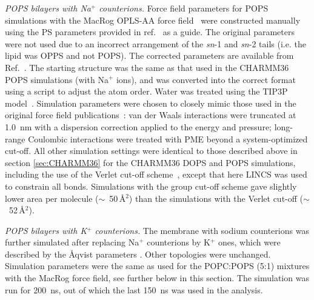 \documentclass[journal=jpcbfk,manuscript=article]{achemso}
\newcommand{\todo}[1]{\textcolor{red}{#1}}
\begin{document}
\noindent
{\it POPS bilayers with Na$^+$ counterions.}
Force field parameters for POPS simulations with the MacRog OPLS-AA force field~\cite{maciejewski14,kulig15b,rog16}
were constructed manually using the PS parameters provided in ref.~ as a guide. The original parameters were
not used due to an incorrect arrangement of the {\it sn}-1 and {\it sn}-2 tails (i.e. the lipid was OPPS and not POPS).
The corrected parameters are available from Ref.~.
The starting structure was the same as that used in the CHARMM36 POPS simulations (with Na$^+$ ions), and was converted into
the correct format using a script to adjust the atom order. Water was treated using the TIP3P model~\cite{jorgensen83}.
Simulation parameters were chosen to closely mimic those used in the original force field publications~\cite{maciejewski14,kulig15b,rog16}:
van der Waals interactions were truncated at 1.0~nm with a dispersion correction applied to the energy and pressure;
long-range Coulombic interactions were treated with PME beyond a system-optimized cut-off.
All other simulation settings were identical to those described above in section \ref{sec:CHARMM36} for the CHARMM36 DOPS and POPS simulations,
including the use of the Verlet cut-off scheme~\cite{Pall13}, except that here LINCS was used to constrain all bonds.
Simulations with the group cut-off scheme gave slightly lower area per molecule ($\sim$~50\,\AA$^2$) than
the simulations with the Verlet cut-off ($\sim$~52\,\AA$^2$).

\noindent
{\it POPS bilayers with K$^+$ counterions.}
The membrane with sodium counterions was further simulated after replacing Na$^+$ counterions by K$^+$ ones, which 
were described by the \AA{}qvist parameters \cite{aqvist90}. Other topologies
were unchanged. Simulation parameters were the same as used for the POPC:POPS (5:1) mixtures with 
the MacRog force field, see further below in this section. The simulation was run for 200~ns, out of which the last 150~ns was used 
in the analysis.
\end{document}
